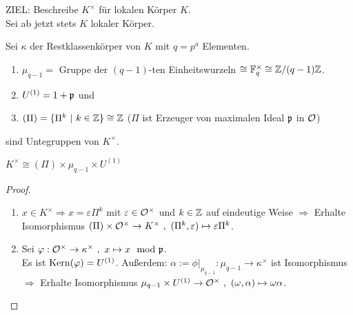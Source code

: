 ZIEL: Beschreibe $K^\times$ für lokalen Körper $K$.\\
Sei ab jetzt stets $K$ lokaler Körper.

\begin{Bem}
Sei $\kappa$ der Restklassenkörper von $K$ mit $q=p^a$ Elementen.
\begin{enumerate}[(1)]
\item $\mu_{q-1}=$ Gruppe der $(q-1)$-ten Einheitswurzeln $\cong \mathbb{F}_q^\times \cong \mathbb{Z}/(q-1)\mathbb{Z}$.
\item $U^{(1)}=1+\mathfrak{p}$ und
\item $(\Pi)=\{\Pi^k \ | \ k \in \mathbb{Z}\}\cong \mathbb{Z}$ ($\Pi$ ist Erzeuger von maximalen Ideal $\mathfrak{p}$ in $\mathcal{O}$)
\end{enumerate}
sind Untegruppen von $K^\times$.
\end{Bem}

\begin{Prop}
$K^\times \cong (\Pi) \times \mu_{q-1} \times U^{(1)}$
\end{Prop}

\begin{proof}
	\begin{enumerate}[(1)]
		\item $x \in K^\times \Rightarrow x= \varepsilon \Pi^k$ mit $\varepsilon \in \mathcal{O}^\times$ und $k \in \mathbb{Z}$ auf eindeutige Weise $\Rightarrow$ Erhalte Isomorphismus $(\Pi)\times \mathcal{O}^\times \to K^\times \ , \ (\Pi^k,\varepsilon) \mapsto \varepsilon \Pi^k$.
		\item Sei $\varphi: \mathcal{O}^\times \to \kappa^\times \ , \ x \mapsto x \mod {\mathfrak{p}}$.\\
		Es ist $\operatorname{Kern}(\varphi)=U^{(1)}$. Außerdem: $\alpha:=\phi|_{\mu_{q-1}}: \mu_{q-1} \to \kappa^\times$ ist Isomorphismus\\
		$\Rightarrow$ Erhalte Isomorphismus $\mu_{q-1}\times U^{(1)} \to \mathcal{O}^\times \ , \ (\omega , \alpha) \mapsto \omega \alpha$.
	\end{enumerate}	
\end{proof}